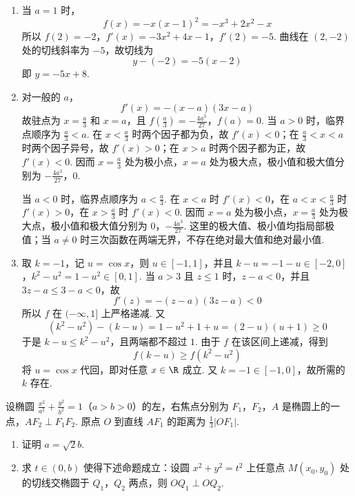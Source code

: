 \begin{solution}
\begin{enumerate}
\item 当 \(a=1\) 时，
\[
f(x)=-x(x-1)^2=-x^3+2x^2-x
\]
所以
\(f(2)=-2\)，\(f'(x)=-3x^2+4x-1\)，\(f'(2)=-5\).
曲线在 \((2,-2)\) 处的切线斜率为 \(-5\)，故切线为
\[
y-(-2)=-5(x-2)
\]
即 \(y=-5x+8\).
\item 对一般的 \(a\)，
\[
f'(x)=-(x-a)(3x-a)
\]
故驻点为 \(x=\frac{a}{3}\) 和 \(x=a\)，且
\(f\left(\frac a3\right)=-\frac{4a^3}{27}\)，\(f(a)=0\).
当 \(a>0\) 时，临界点顺序为 \(\frac{a}{3}<a\). 在 \(x<\frac{a}{3}\) 时两个因子都为负，故 \(f'(x)<0\)；在 \(\frac{a}{3}<x<a\) 时两个因子异号，故 \(f'(x)>0\)；在 \(x>a\) 时两个因子都为正，故 \(f'(x)<0\). 因而 \(x=\frac{a}{3}\) 处为极小点，\(x=a\) 处为极大点，极小值和极大值分别为
\(-\frac{4a^3}{27}\)，\(0\).

当 \(a<0\) 时，临界点顺序为 \(a<\frac{a}{3}\). 在 \(x<a\) 时 \(f'(x)<0\)，在 \(a<x<\frac{a}{3}\) 时 \(f'(x)>0\)，在 \(x>\frac{a}{3}\) 时 \(f'(x)<0\). 因而 \(x=a\) 处为极小点，\(x=\frac{a}{3}\) 处为极大点，极小值和极大值分别为
\(0\)，\(-\frac{4a^3}{27}\).
这里的极大值、极小值均指局部极值；当 \(a\ne0\) 时三次函数在两端无界，不存在绝对最大值和绝对最小值.
\item 取 \(k=-1\)，记 \(u=\cos x\)，则 \(u\in[-1,1]\)，并且
\(k-u=-1-u\in[-2,0]\)，\(k^2-u^2=1-u^2\in[0,1]\).
当 \(a>3\) 且 \(z\leqslant1\) 时，\(z-a<0\)，并且 \(3z-a\leqslant3-a<0\)，故
\[
f'(z)=-(z-a)(3z-a)<0
\]
所以 \(f\) 在 \((-\infty,1]\) 上严格递减. 又
\[
(k^2-u^2)-(k-u)=1-u^2+1+u=(2-u)(u+1)\geqslant0
\]
于是 \(k-u\leqslant k^2-u^2\)，且两端都不超过 \(1\). 由于 \(f\) 在该区间上递减，得到
\[
f(k-u)\geqslant f(k^2-u^2)
\]
将 \(u=\cos x\) 代回，即对任意 \(x\in\R\) 成立. 又 \(k=-1\in[-1,0]\)，故所需的 \(k\) 存在.
\end{enumerate}
\end{solution}

\begin{problem}
设椭圆 \(\frac{x^2}{a^2} + \frac{y^2}{b^2} = 1\)（\(a > b > 0\)）的左，右焦点分别为 \(F_1\)，\(F_2\)，\(A\) 是椭圆上的一点，\(AF_2 \perp F_1F_2\). 原点 \(O\) 到直线 \(AF_1\) 的距离为 \(\frac{1}{3}|OF_1|\).

\begin{enumerate}
\item 证明 \(a = \sqrt{2} b\).
\item 求 \(t \in (0, b)\) 使得下述命题成立：设圆 \(x^{2} + y^{2} = t^{2}\) 上任意点 \(M(x_{0}, y_{0})\) 处的切线交椭圆于 \(Q_{1}\)，\(Q_{2}\) 两点，则 \(OQ_{1} \perp OQ_{2}\).
\end{enumerate}
\end{problem}

